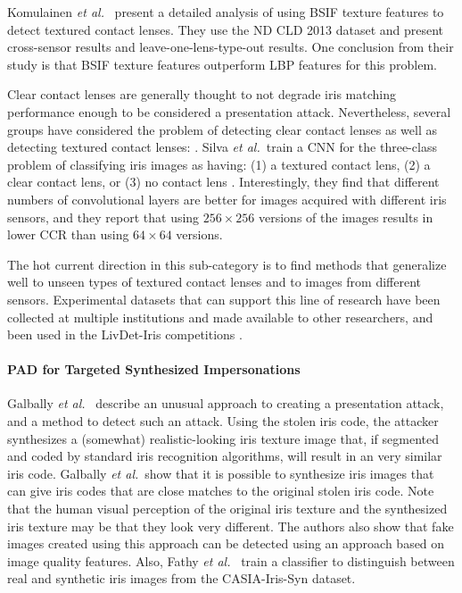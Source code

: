 \documentclass[format=acmsmall, review=false, timestamp=false]{acmart}
\newcommand{\etal}{{\it et al.}~}
\begin{document}
Komulainen \etal {\cite{Komulainen_IJCB_2014,Komulainen_IETbook_Ch12_2017}} present a detailed analysis of using BSIF texture features to detect textured contact lenses. They use the {\sf ND CLD 2013} dataset and present cross-sensor results and leave-one-lens-type-out results. One conclusion from their study is that BSIF texture features outperform LBP features for this problem.

Clear contact lenses are generally thought to not degrade iris matching performance enough to be considered a presentation attack. Nevertheless, several groups have considered the problem of detecting clear contact lenses as well as detecting textured contact lenses: \cite{Doyle_ICB_2013,Gragnaniello_PRL_2016,Silva_SIBGRAPI_2015,Yadav_TIFS_2014,Singh_ISBA_2018}. Silva \etal train a CNN for the three-class problem of classifying iris images as having: (1) a textured contact lens, (2) a clear contact lens, or (3) no contact lens \cite{Silva_SIBGRAPI_2015}. Interestingly, they find that different numbers of convolutional layers are better for images acquired with different iris sensors, and they report that using $256\times256$ versions of the images results in lower {CCR} than using $64\times64$ versions.
 
The hot current direction in this sub-category is to find methods that generalize well to unseen types of textured contact lenses and to images from different sensors. Experimental datasets that can support this line of research have been collected at multiple institutions and made available to other researchers, and been used in the LivDet-Iris competitions \cite{Yambay_IJCB_2017}.



\paragraph{PAD for Targeted Synthesized Impersonations}

Galbally \etal \cite{Galbally_Handbook_2016} describe an unusual approach to creating a presentation attack, and a method to detect such an attack. Using the stolen iris code, the attacker synthesizes a (somewhat) realistic-looking iris texture image that, if segmented and coded by standard iris recognition algorithms, will result in an very similar iris code.  Galbally \etal show that it is possible to synthesize iris images that can give iris codes that are close matches to the original stolen iris code. Note that the human visual perception of the original iris texture and the synthesized iris texture may be that they look very different. The authors also show that {fake} images created using this approach can be detected using an approach based on image quality features. {Also, Fathy \etal \cite{Fathy_NRSC_2017} train a classifier to distinguish between real and synthetic iris images from the {\sf CASIA-Iris-Syn} dataset.}
\end{document}

